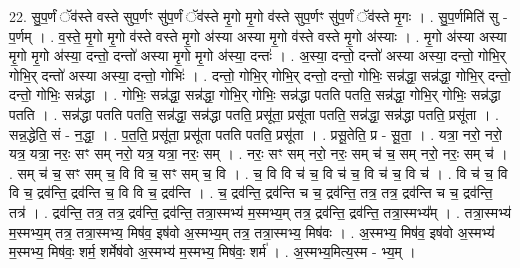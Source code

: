 \documentclass[17pt]{extarticle}
\begin{document}
22. सु॒प॒र्णं ॅव॑स्ते वस्ते सुप॒र्णꣳ सु॑प॒र्णं ॅव॑स्ते मृ॒गो मृ॒गो व॑स्ते सुप॒र्णꣳ सु॑प॒र्णं ॅव॑स्ते मृ॒गः । . सु॒प॒र्णमिति॑ सु - प॒र्णम् । . व॒स्ते॒ मृ॒गो मृ॒गो व॑स्ते वस्ते मृ॒गो अ॑स्या अस्या मृ॒गो व॑स्ते वस्ते मृ॒गो अ॑स्याः । . मृ॒गो अ॑स्या अस्या मृ॒गो मृ॒गो अ॑स्या॒ दन्तो॒ दन्तो॑ अस्या मृ॒गो मृ॒गो अ॑स्या॒ दन्तः॑ । . अ॒स्या॒ दन्तो॒ दन्तो॑ अस्या अस्या॒ दन्तो॒ गोभि॒र् गोभि॒र् दन्तो॑ अस्या अस्या॒ दन्तो॒ गोभिः॑ । . दन्तो॒ गोभि॒र् गोभि॒र् दन्तो॒ दन्तो॒ गोभिः॒ सन्न॑द्धा॒ सन्न॑द्धा॒ गोभि॒र् दन्तो॒ दन्तो॒ गोभिः॒ सन्न॑द्धा । . गोभिः॒ सन्न॑द्धा॒ सन्न॑द्धा॒ गोभि॒र् गोभिः॒ सन्न॑द्धा पतति पतति॒ सन्न॑द्धा॒ गोभि॒र् गोभिः॒ सन्न॑द्धा पतति । . सन्न॑द्धा पतति पतति॒ सन्न॑द्धा॒ सन्न॑द्धा पतति॒ प्रसू॑ता॒ प्रसू॑ता पतति॒ सन्न॑द्धा॒ सन्न॑द्धा पतति॒ प्रसू॑ता । . सन्न॒द्धेति॒ सं - न॒द्धा॒ । . प॒त॒ति॒ प्रसू॑ता॒ प्रसू॑ता पतति पतति॒ प्रसू॑ता । . प्रसू॒तेति॒ प्र - सू॒ता॒ । . यत्रा॒ नरो॒ नरो॒ यत्र॒ यत्रा॒ नरः॒ सꣳ सम् नरो॒ यत्र॒ यत्रा॒ नरः॒ सम् । . नरः॒ सꣳ सम् नरो॒ नरः॒ सम् च॑ च॒ सम् नरो॒ नरः॒ सम् च॑ । . सम् च॑ च॒ सꣳ सम् च॒ वि वि च॒ सꣳ सम् च॒ वि । . च॒ वि वि च॑ च॒ वि च॑ च॒ वि च॑ च॒ वि च॑ । . वि च॑ च॒ वि वि च॒ द्रव॑न्ति॒ द्रव॑न्ति च॒ वि वि च॒ द्रव॑न्ति । . च॒ द्रव॑न्ति॒ द्रव॑न्ति च च॒ द्रव॑न्ति॒ तत्र॒ तत्र॒ द्रव॑न्ति च च॒ द्रव॑न्ति॒ तत्र॑ । . द्रव॑न्ति॒ तत्र॒ तत्र॒ द्रव॑न्ति॒ द्रव॑न्ति॒ तत्रा॒स्मभ्य॑ म॒स्मभ्य॒म् तत्र॒ द्रव॑न्ति॒ द्रव॑न्ति॒ तत्रा॒स्मभ्य᳚म् । . तत्रा॒स्मभ्य॑ म॒स्मभ्य॒म् तत्र॒ तत्रा॒स्मभ्य॒ मिष॑व॒ इष॑वो अ॒स्मभ्य॒म् तत्र॒ तत्रा॒स्मभ्य॒ मिष॑वः । . अ॒स्मभ्य॒ मिष॑व॒ इष॑वो अ॒स्मभ्य॑ म॒स्मभ्य॒ मिष॑वः॒ शर्म॒ शर्मेष॑वो अ॒स्मभ्य॑ म॒स्मभ्य॒ मिष॑वः॒ शर्म॑ । . अ॒स्मभ्य॒मित्य॒स्म - भ्य॒म् । \newline
\end{document}
